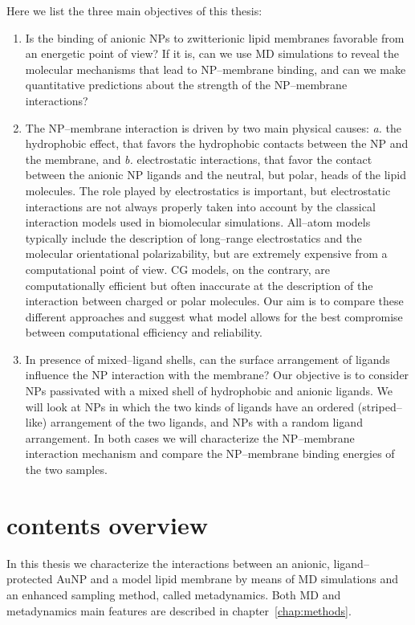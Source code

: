 Here we list the three main objectives of this thesis:
\begin{enumerate}[label=\itshape\roman*.]
	\item Is the binding of anionic \acp{NP} to zwitterionic lipid membranes favorable from an energetic point of 
	view? If it is, can we use \ac{MD} simulations to reveal the molecular mechanisms that lead to
	\ac{NP}--membrane binding, and can we make quantitative predictions about the strength of the 
	\ac{NP}--membrane 
	interactions?%
	\item The \ac{NP}--membrane interaction is driven by two main physical causes: \textit{a.} the hydrophobic 
	effect, that favors the hydrophobic contacts between the \ac{NP} and the membrane, and \textit{b.} 
	electrostatic interactions, that favor the contact between the anionic \ac{NP} ligands and the neutral, but 
	polar, heads of the lipid molecules. The role played by electrostatics is important, but electrostatic 
	interactions are not always properly taken into account by the classical interaction models used in 
	biomolecular simulations. All--atom models typically include the description of long--range electrostatics and 
	the molecular orientational polarizability, but are extremely expensive from a computational point of view. 
	\ac{CG} models, on the contrary, are computationally efficient but often inaccurate at the description of the 
	interaction between charged or polar molecules. Our aim is to compare these different approaches and suggest 
	what model allows for the best compromise between computational efficiency and reliability.%
	\item In presence of mixed--ligand shells, can the surface arrangement of ligands influence the \ac{NP} 
	interaction with the membrane? Our objective is to consider \acp{NP} passivated with a mixed shell of 
	hydrophobic and anionic ligands. We will look at \acp{NP} in which the two kinds of ligands have an ordered 
	(striped--like) arrangement of the two ligands, and \acp{NP} with a random ligand arrangement. In both cases 
	we will characterize the \ac{NP}--membrane interaction mechanism and compare the \ac{NP}--membrane binding 
	energies of the two samples.%
\end{enumerate}

\section{contents overview}
In this thesis we characterize the interactions between an anionic, ligand--protected \ac{AuNP} and a model lipid 
membrane by means of \ac{MD} simulations and an enhanced sampling method, called metadynamics. Both \ac{MD} and 
metadynamics main features are described in chapter~\ref{chap:methods}.

